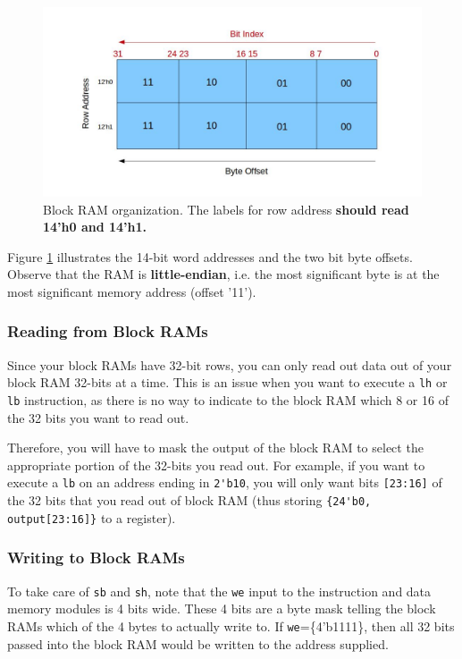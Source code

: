 \documentclass[11pt]{article}
\begin{document}
\label{endianness}
\begin{figure}[hbt]
	\begin{center}
		\includegraphics[width=5in]{endianness_img}
		\caption{Block RAM organization. The labels for row address \textbf{should read 14'h0 and 14'h1.}}
		\label{fig:endianness_img}
	\end{center}
\end{figure}

Figure \ref{fig:endianness_img} illustrates the 14-bit word addresses and the two bit byte offsets. Observe that the RAM is \textbf{little-endian}, i.e. the most significant byte is at the most significant memory address (offset '11').

\subsubsection{Reading from Block RAMs}
Since your block RAMs have 32-bit rows, you can only read out data out of your block RAM 32-bits at a time. This is an issue when you want to execute a \verb|lh| or \verb|lb| instruction, as there is no way to indicate to the block RAM which 8 or 16 of the 32 bits you want to read out. 

Therefore, you will have to mask the output of the block RAM to select the appropriate portion of the 32-bits you read out. For example, if you want to execute a \verb|lb| on an address ending in \verb|2'b10|, you will only want bits \verb|[23:16]| of the 32 bits that you read out of block RAM (thus storing \verb|{24'b0, output[23:16]}| to a register).

\subsubsection{Writing to Block RAMs}
To take care of \verb|sb| and \verb|sh|, note that the \verb|we| input to the instruction and data memory modules is 4 bits wide. These 4 bits are a byte mask telling the block RAMs which of the 4 bytes to actually write to. If \verb|we|=\{4'b1111\}, then all 32 bits passed into the block RAM would be written to the address supplied. 
\end{document}
